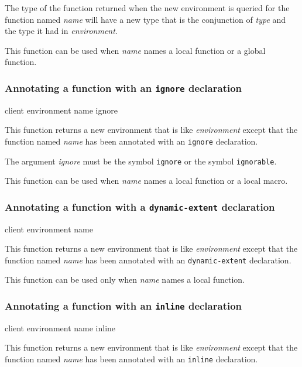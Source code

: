 The type of the function returned when the new environment is queried
for the function named \textit{name} will have a new type that is the
conjunction of \textit{type} and the type it had in
\textit{environment}.

This function can be used when \textit{name} names a local function or
a global function.

\subsubsection{Annotating a function with an \texttt{ignore} declaration}
\label{sec-annotating-a-function-with-ignore}

{\footnotesize
{} {client environment name ignore}
}

This function returns a new environment that is like
\textit{environment} except that the function named \textit{name} has
been annotated with an \texttt{ignore} declaration.

The argument \textit{ignore} must be the symbol \texttt{ignore} or the
symbol \texttt{ignorable}.

This function can be used when \textit{name} names a local function or
a local macro.

\subsubsection{Annotating a function with a \texttt{dynamic-extent} declaration}
\label{sec-annotating-a-function-with-dynamic-extent}

{\footnotesize
{} {client environment name}
}

This function returns a new environment that is like
\textit{environment} except that the function named \textit{name} has
been annotated with an \texttt{dynamic-extent} declaration.

This function can be used only when \textit{name} names a local function.

\subsubsection{Annotating a function with an \texttt{inline} declaration}
\label{sec-annotating-a-function-with-inline}

{\footnotesize
{} {client environment name inline}
}

This function returns a new environment that is like
\textit{environment} except that the function named \textit{name} has
been annotated with an \texttt{inline} declaration.

